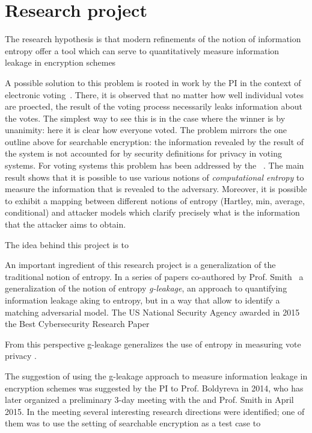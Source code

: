 \newpage

\section{Research project}
\label{sec:prop_hyp}

The research hypothesis is that modern refinements of the notion of information entropy offer a tool which can serve to quantitatively measure information leakage in encryption schemes 


A possible solution to this problem is rooted in work by the PI in the context of electronic voting~\cite{bernhard2012measuring}. 
There, it is observed that no matter how well individual votes are proected, the result of the voting process necessarily leaks information about the votes.
The simplest way to see this is in the case where the winner is by unanimity: here it is clear how everyone voted.  The problem mirrors the one outline above for searchable encryption:  the information revealed by the result of the system is not accounted for by security definitions for privacy in voting systems. 
For voting systems this problem has been addressed by the \PI~\cite{bernhard2012measuring}. 
The main result shows that it is possible to use various notions of \emph{computational entropy} to measure the information that is revealed to the adversary.  
Moreover, it is possible to exhibit a mapping between different notions of entropy (Hartley, min, average, conditional) and attacker models which clarify precisely what is the information that the attacker aims to obtain. 

The idea behind this project is to 


An important ingredient of this research project is a generalization of the traditional notion of entropy. 
In a series of papers co-authored by Prof. Smith~\cite{DBLP:conf/csfw/AlvimCPS12,DBLP:conf/csfw/AlvimCMMPS14,DBLP:conf/csfw/AlvimCMMPS16,DBLP:conf/csfw/SmithS17} a generalization of the notion of entropy \emph{g-leakage}, 
an approach to quantifying information leakage aking to entropy, but in a way that allow to identify a matching adversarial model.  
The US National Security Agency awarded in 2015 the Best Cybersecurity Research Paper 

From this perspective g-leakage generalizes the use of entropy in measuring vote privacy \cite{bernhard2012measuring}. 

The suggestion of using the g-leakage approach to measure information leakage in encryption schemes was suggested by the PI to Prof. Boldyreva in 2014, who has later organized a preliminary 3-day meeting with the \PI and Prof. Smith in April 2015.  
In the meeting several interesting research directions were identified; one of them was to use the setting of searchable encryption as a test case to 

